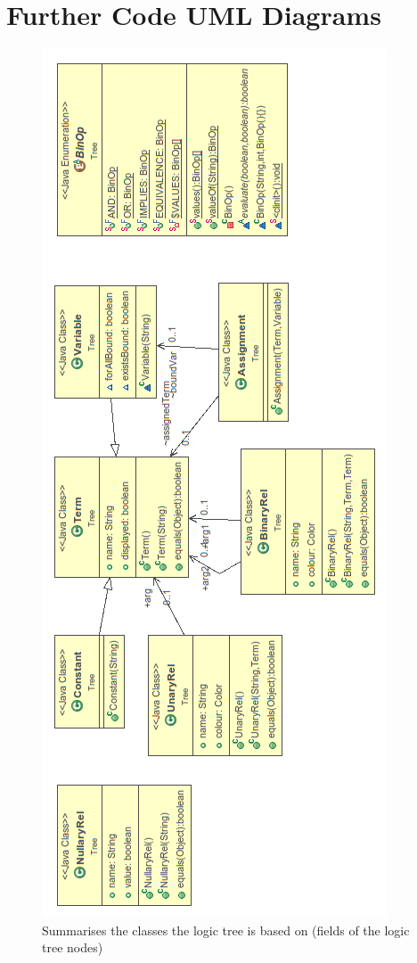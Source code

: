 \documentclass{report}
\begin{document}
\chapter{Further Code UML Diagrams\cite{uml}}
\newpage

\begin{figure}[h!]
\centering \includegraphics[height=\textheight]{treeBase.png}
\caption{Summarises the classes the logic tree is based on (fields of the logic 
tree nodes)}
\end{figure}
\newpage
\end{document}

